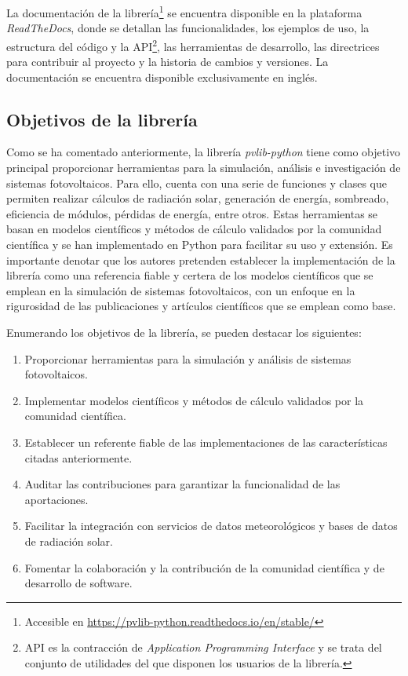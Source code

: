 La documentación de la librería\footnote{Accesible en \url{https://pvlib-python.readthedocs.io/en/stable/}} se encuentra disponible en la plataforma\\ \mbox{\textit{ReadTheDocs}}, donde se detallan las funcionalidades, los ejemplos de uso, la estructura del código y la API\footnote{API es la contracción de \textit{Application Programming Interface} y se trata del conjunto de utilidades del que disponen los usuarios de la librería.}, las herramientas de desarrollo, las directrices para contribuir al proyecto y la historia de cambios y versiones. La documentación se encuentra disponible exclusivamente en inglés.

\subsection{Objetivos de la librería} \label{ssct:pvlib:objetivos}

Como se ha comentado anteriormente, la librería \textit{pvlib-python} tiene como objetivo principal proporcionar herramientas para la simulación, análisis e investigación de sistemas fotovoltaicos. Para ello, cuenta con una serie de funciones y clases que permiten realizar cálculos de radiación solar, generación de energía, sombreado, eficiencia de módulos, pérdidas de energía, entre otros. Estas herramientas se basan en modelos científicos y métodos de cálculo validados por la comunidad científica y se han implementado en Python para facilitar su uso y extensión. Es importante denotar que los autores pretenden establecer la implementación de la librería como una referencia fiable y certera de los modelos científicos que se emplean en la simulación de sistemas fotovoltaicos, con un enfoque en la rigurosidad de las publicaciones y artículos científicos que se emplean como base.

Enumerando los objetivos de la librería, se pueden destacar los siguientes:

\begin{enumerate}
      \item Proporcionar herramientas para la simulación y análisis de sistemas fotovoltaicos.
      \item Implementar modelos científicos y métodos de cálculo validados por la comunidad científica.
      \item Establecer un referente fiable de las implementaciones de las características citadas anteriormente.
      \item Auditar las contribuciones para garantizar la funcionalidad de las aportaciones.
      \item Facilitar la integración con servicios de datos meteorológicos y bases de datos de radiación solar.
      \item Fomentar la colaboración y la contribución de la comunidad científica y de desarrollo de software.
\end{enumerate}

